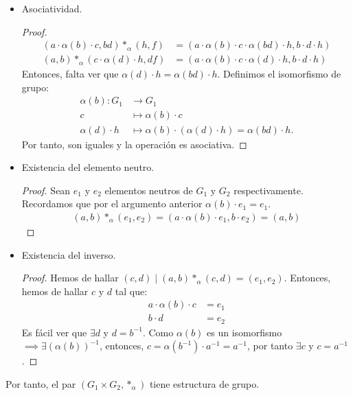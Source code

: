 \begin{itemize}
	\item Asociatividad.
	\begin{proof}
		\begin{align*}
		(a\cdot\alpha(b)\cdot c, bd) \ast_\alpha (h,f) &= (a\cdot\alpha(b)\cdot c\cdot \alpha(bd)\cdot h, b\cdot d\cdot h)\\
		(a,b)\ast_\alpha(c\cdot\alpha(d)\cdot h, df) &= (a\cdot\alpha(b)\cdot c\cdot \alpha(d)\cdot h, b\cdot d\cdot h)
		\end{align*}
		Entonces, falta ver que $\alpha(d)\cdot h = \alpha(bd)\cdot h$. Definimos el isomorfismo de grupo:
		\begin{align*}
		\alpha(b) : G_1 &\longrightarrow G_1\\
		c &\longmapsto \alpha(b)\cdot c\\
		\alpha(d)\cdot h &\longmapsto \alpha(b)\cdot(\alpha(d)\cdot h) = \alpha(bd) \cdot h.
		\end{align*}
		Por tanto, son iguales y la operación es asociativa.
	\end{proof}	
	\item Existencia del elemento neutro.
	\begin{proof}
		Sean $e_1$ y $e_2$ elementos neutros de $G_1$ y $G_2$ respectivamente. Recordamos que por el argumento anterior $\alpha(b)\cdot e_1 = e_1$.
		\begin{align*}
		(a,b) \ast_\alpha (e_1, e_2) = (a \cdot \alpha(b) \cdot e_1, b \cdot e_2) = (a,b)
		\end{align*}
	\end{proof}
	\item Existencia del inverso.
	\begin{proof}
		Hemos de hallar $(c,d) \mid (a,b)\ast_\alpha(c,d) = (e_1,e_2)$.  Entonces, hemos de hallar $c$ y $d$ tal que:
		\begin{align*}
		a \cdot \alpha(b) \cdot c &= e_1\\
		b \cdot d &= e_2
		\end{align*}
		Es fácil ver que $\exists d$ y $d = b^{-1}$. Como $\alpha(b)$ es un isomorfismo $\implies \exists (\alpha(b))^{-1}$, entonces, $c = \alpha(b^{-1}) \cdot a^{-1} = a^{-1}$, por tanto $\exists c$ y $c = a^{-1}$.
	\end{proof}
	
\end{itemize}
Por tanto, el par $(G_1 \times G_2, \ast_\alpha)$ tiene estructura de grupo.\\

